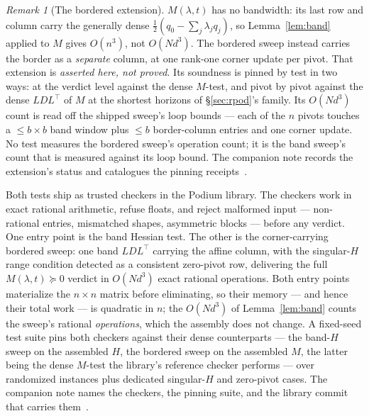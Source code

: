 \documentclass[11pt]{article}
\theoremstyle{definition}
\theoremstyle{remark}
\newtheorem{remark}{Remark}
\renewcommand{\_}{\ifdim\fontdimen3\font=0pt\relax\char`\_\else\textunderscore\fi\hspace{0pt}}
\begin{document}
\begin{remark}[The bordered extension]\label{rem:bordered}
$M(\lambda,t)$ has no bandwidth: its last row and column carry the generally
dense $\tfrac12(q_0-\sum_j\lambda_jq_j)$, so Lemma~\ref{lem:band} applied to
$M$ gives $O(n^3)$, not $O(Nd^3)$. The bordered sweep instead carries the
border as a \emph{separate} column, at one rank-one corner update per pivot.
That extension is \emph{asserted here, not proved}. Its soundness is pinned by
test in two ways: at the verdict level against the dense $M$-test, and pivot
by pivot against the dense $LDL^\top$ of $M$ at the shortest horizons of
\S\ref{sec:rpod}'s family. Its $O(Nd^3)$ count is read off the shipped sweep's
loop bounds --- each of the $n$ pivots touches a $\le b\times b$ band window
plus $\le b$ border-column entries and one corner update. No test measures the
bordered sweep's operation count; it is the band sweep's count that is
measured against its loop bound. The companion note records the extension's
status and catalogues the pinning receipts~\cite{leannote}.
\end{remark}

Both tests ship as trusted checkers in the Podium library. The
checkers work in exact rational arithmetic, refuse floats, and reject
malformed input --- non-rational entries, mismatched shapes, asymmetric
blocks --- before any verdict. One entry point is the band Hessian test. The
other is the corner-carrying bordered sweep: one band $LDL^\top$ carrying the
affine column, with the singular-$H$ range condition detected as a consistent
zero-pivot row, delivering the full $M(\lambda,t)\succeq0$ verdict in
$O(Nd^3)$ exact rational operations. Both entry points materialize the
$n\times n$ matrix before eliminating, so their memory --- and hence their
total work --- is quadratic in $n$; the $O(Nd^3)$ of Lemma~\ref{lem:band}
counts the sweep's rational \emph{operations}, which the assembly does not
change. A fixed-seed test suite pins both checkers against their dense
counterparts --- the band-$H$ sweep on the assembled $H$, the bordered sweep
on the assembled $M$, the latter being the dense $M$-test the library's
reference checker performs --- over randomized instances plus dedicated
singular-$H$ and zero-pivot cases. The companion note names the checkers, the
pinning suite, and the library commit that carries them~\cite{leannote}.
\end{document}

